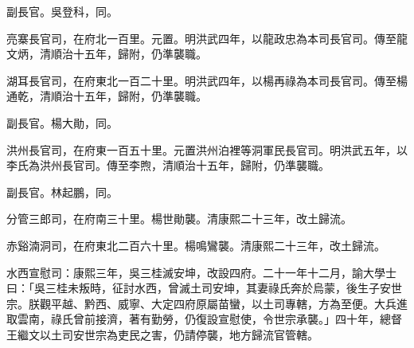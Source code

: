 \begin{pinyinscope}
副長官。吳登科，同。

亮寨長官司，在府北一百里。元置。明洪武四年，以龍政忠為本司長官司。傳至龍文炳，清順治十五年，歸附，仍準襲職。

湖耳長官司，在府東北一百二十里。明洪武四年，以楊再祿為本司長官司。傳至楊通乾，清順治十五年，歸附，仍準襲職。

副長官。楊大勛，同。

洪州長官司，在府東一百五十里。元置洪州泊裡等洞軍民長官司。明洪武五年，以李氏為洪州長官司。傳至李煦，清順治十五年，歸附，仍準襲職。

副長官。林起鵬，同。

分管三郎司，在府南三十里。楊世勛襲。清康熙二十三年，改土歸流。

赤谿湳洞司，在府東北二百六十里。楊鳴鸞襲。清康熙二十三年，改土歸流。

水西宣慰司：康熙三年，吳三桂滅安坤，改設四府。二十一年十二月，諭大學士曰：「吳三桂未叛時，征討水西，曾滅土司安坤，其妻祿氏奔於烏蒙，後生子安世宗。朕觀平越、黔西、威寧、大定四府原屬苗蠻，以土司專轄，方為至便。大兵進取雲南，祿氏曾前接濟，著有勤勞，仍復設宣慰使，令世宗承襲。」四十年，總督王繼文以土司安世宗為吏民之害，仍請停襲，地方歸流官管轄。


\end{pinyinscope}